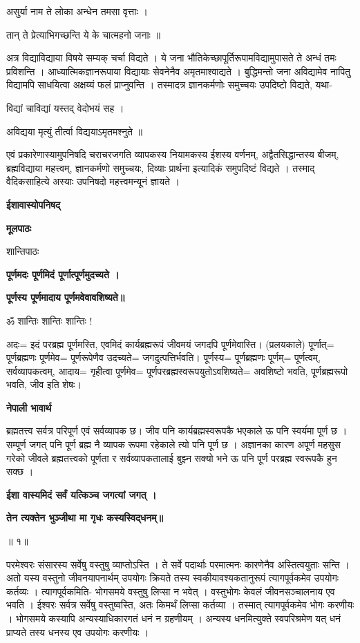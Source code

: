 \documentclass[11pt, a5paper]{article}
\begin{document}
असुर्या नाम ते लोका अन्धेन तमसा वृत्ताः ।

तान् ते प्रेत्याभिगच्छन्ति ये के चात्महनो जनाः ॥

अत्र विद्याविद्याया विषये सम्यक् चर्चा विद्यते । ये जना भौतिकेच्छापूर्तिरूपामविद्यामुपासते ते अन्धं तमः प्रविशन्ति । आध्यात्मिकज्ञानरूपाया विद्यायाः सेवनेनैव अमृतमाश्वाद्यते । बुद्धिमन्तो जना अविद्यामेव नापितु विद्यामपि साधयित्वा अक्षय्यं फलं प्राप्नुवन्ति । तस्मादत्र ज्ञानकर्मणोः समुच्चयः उपदिष्टो विद्यते, यथा-

विद्यां चाविद्यां यस्तद् वेदोभयं सह ।

अविद्यया मृत्युं तीर्त्वा विद्ययाऽमृतमश्नुते ॥

एवं प्रकारेणास्यामुपनिषदि चराचरजगति व्यापकस्य नियामकस्य ईशस्य वर्णनम्, अद्वैतसिद्धान्तस्य बीजम्, ब्रह्मविद्याया महत्त्वम्, ज्ञानकर्मणो समुच्चयः, दिव्याः प्रार्थना इत्यादिकं समुपदिष्टं विद्यते । तस्माद् वैदिकसाहित्ये अस्याः उपनिषदो महत्त्वमन्यूनं ज्ञायते ।

\textbf{ईशावास्योपनिषद्}

\textbf{मूलपाठः}

शान्तिपाठः

\textbf{पूर्णमदः पूर्णमिदं पूर्णात्पूर्णमुदच्यते ।}

\textbf{पूर्णस्य पूर्णमादाय पूर्णमवेवावशिष्यते॥}

ॐ शान्तिः शान्तिः शान्तिः !

अदः= इदं परब्रह्म पूर्णमस्ति, एवमिदं कार्यब्रह्मरूपं जीवमयं जगदपि  पूर्णमेवास्ति। (प्रलयकाले) पूर्णात्= पूर्णब्रह्मणः पूर्णमेव= पूर्णरूपेणैव उदच्यते= जगदुत्पत्तिर्भवति। पूर्णस्य= पूर्णब्रह्मणः पूर्णम्= पूर्णत्वम्, सर्वव्यापकत्वम्, आदाय= गृहीत्वा पूर्णमेव= पूर्णपरब्रह्मस्वरूपयुतोऽवशिष्यते= अवशिष्टो भवति, पूर्णब्रह्मरूपो भवति,  जीव इति शेषः।

\textbf{नेपाली भावार्थ}

ब्रह्मतत्त्व सर्वत्र परिपूर्ण एवं सर्वव्यापक छ। जीव पनि कार्यब्रह्मस्वरूपकै भएकाले ऊ पनि स्वयंंमा पूर्ण छ । सम्पूर्ण जगत् पनि पूर्ण ब्रह्म नै व्यापक रूपमा रहेकाले त्यो पनि पूर्ण छ । अज्ञानका कारण अपूर्ण महसुस गरेको जीवले ब्रह्मतत्त्वको पूर्णता र सर्वव्यापकतालाई बुझ्न सक्यो भने ऊ पनि पूर्ण परब्रह्म स्वरूपकै हुन सक्छ ।

\textbf{ईशा वास्यमिदं सर्वं यत्किञ्च जगत्यां जगत् ।}

\textbf{तेन त्यक्तेन भुञ्जीथा मा गृधः कस्यस्विद्‌धनम्॥}

॥ १॥

परमेश्वरः संसारस्य सर्वेषु वस्तुषु व्याप्तोऽस्ति । ते सर्वे पदार्थाः परमात्मनः कारणेनैव अस्तित्वयुताः सन्ति । अतो यस्य वस्तुनो जीवनयापनार्थम् उपयोगः क्रियते तस्य स्वकीयावश्यकतानुरूपं त्यागपूर्वकमेव उपयोगः कर्तव्यः । त्यागपूर्वकमिति-    भोगसमये वस्तुषु लिप्सा न भवेत् ।  वस्तुभोगः केवलं जीवनसञ्चालनाय एव भवति । ईश्वरः सर्वत्र सर्वेषु वस्तुष्वस्ति, अतः किमर्थं लिप्सा कर्तव्या । तस्मात् त्यागपूर्वकमेव भोगः करणीयः । भोगसमये कस्यापि अन्यस्याधिकारगतं धनं न ग्रहणीयम् । अन्यस्य धनमित्युक्ते स्वपरिश्रमेण यत् धनं प्राप्यते तस्य धनस्य एव उपयोगः करणीयः ।
\end{document}
